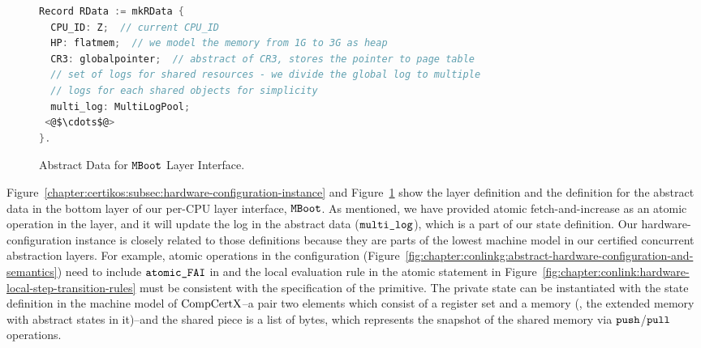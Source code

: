 \begin{figure}
\begin{lstlisting}[language=C]
Record RData := mkRData {
  CPU_ID: Z;  // current CPU_ID
  HP: flatmem;  // we model the memory from 1G to 3G as heap            
  CR3: globalpointer;  // abstract of CR3, stores the pointer to page table
  // set of logs for shared resources - we divide the global log to multiple
  // logs for each shared objects for simplicity   
  multi_log: MultiLogPool;     
 <@$\cdots$@>
}.
\end{lstlisting}
\caption{Abstract Data for  ${\mathrm{\texttt{MBoot}}}$ Layer Interface.}
\label{fig:chapter:certikos:abstract-data-for-bottom-layer}
\end{figure}

Figure~\ref{chapter:certikos:subsec:hardware-configuration-instance}
 and 
  Figure~\ref{fig:chapter:certikos:abstract-data-for-bottom-layer}
  show the layer definition 
  and the definition for the abstract data 
  in the bottom layer of our per-CPU layer interface, ${\mathrm{\texttt{MBoot}}}$.
%
As mentioned, 
we have provided atomic fetch-and-increase as an atomic operation in the layer,
and it will update the log in the abstract data (${\mathrm{\texttt{multi\_log}}}$), which is 
a part of our state definition. 
Our hardware-configuration instance is closely related to those definitions
because they are parts of the lowest machine model 
in our certified concurrent abstraction layers.
For example, atomic operations in the configuration (Figure~\ref{fig:chapter:conlinkg:abstract-hardware-configuration-and-semantics})
need to include ${\mathrm{\texttt{atomic\_FAI}}}$  
in and the local evaluation rule in the atomic statement in Figure~\ref{fig:chapter:conlink:hardware-local-step-transition-rules}  must be
consistent with the specification of the primitive.
The private state can be instantiated with 
the state definition in the machine model of $\mathrm{CompCertX}$--a pair two elements which consist of a register set 
and a memory (\ie, the extended memory with  abstract states in it)--and the shared piece is a list of bytes, which represents 
the snapshot of the shared memory via ${\mathrm{\texttt{push}}}$/${\mathrm{\texttt{pull}}}$ operations. 

